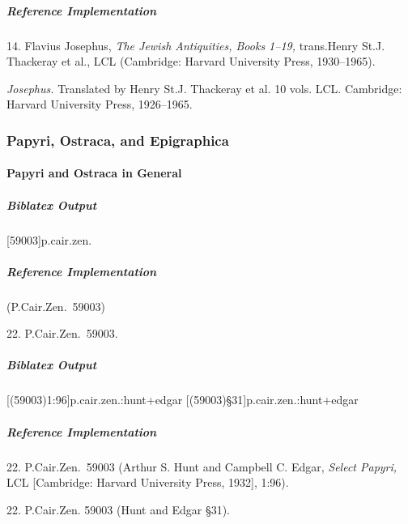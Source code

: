 \documentclass[a4paper]{article}
\newenvironment{biboutput}{%
  \subparagraph{Biblatex Output}
}{\color{black}}
\newenvironment{refimp}{%
  \subparagraph{Reference Implementation}
  \color{reference-colour}
  \rm
}{\par\color{black}}
\begin{document}
\begin{refimp}
  \hspace*{\bibindent}14. Flavius Josephus, \emph{The Jewish Antiquities,
  Books 1–19,} trans.\@ Henry St.\@ J. Thackeray et al., LCL (Cambridge:
  Harvard University Press, 1930–1965).

  \hangindent\bibindent \emph{Josephus.} Translated by Henry St.\@ J. Thackeray
  et al. 10 vols. LCL. Cambridge: Harvard University Press, 1926–1965.

\end{refimp}

\subsubsection{Papyri, Ostraca, and Epigraphica}

\paragraph{Papyri and Ostraca in General}

\begin{biboutput}
  [59003]{p.cair.zen.}
\end{biboutput}

\begin{refimp}
  (P.Cair.Zen.\ 59003)

  \hspace*{\bibindent}22. P.Cair.Zen.\ 59003.
\end{refimp}

\begin{biboutput}
  [(59003)1:96]{p.cair.zen.:hunt+edgar}
  [(59003)§31]{p.cair.zen.:hunt+edgar}
\end{biboutput}

\begin{refimp}
  \hspace*{\bibindent}22. P.Cair.Zen.\ 59003 (Arthur S. Hunt and Campbell C.
  Edgar, \emph{Select Papyri,} LCL [Cambridge: Harvard University Press,
  1932], 1:96).

  \hspace*{\bibindent}22. P.Cair.Zen. 59003 (Hunt and Edgar §31).

\end{refimp}
\end{document}
